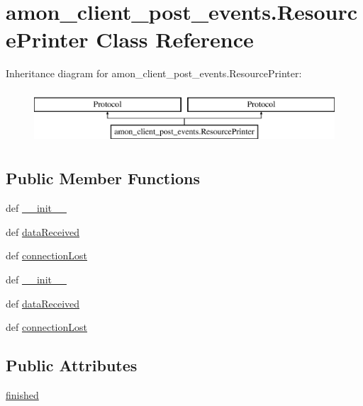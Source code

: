 \hypertarget{classamon__client__post__events_1_1_resource_printer}{\section{amon\-\_\-client\-\_\-post\-\_\-events.\-Resource\-Printer Class Reference}
\label{classamon__client__post__events_1_1_resource_printer}
}
Inheritance diagram for amon\-\_\-client\-\_\-post\-\_\-events.\-Resource\-Printer\-:\begin{figure}[H]
\begin{center}
\leavevmode
\includegraphics[height=2.000000cm]{d6/d38/classamon__client__post__events_1_1_resource_printer}
\end{center}
\end{figure}
\subsection*{Public Member Functions}
\begin{DoxyCompactItemize}
\item 
def \hyperlink{classamon__client__post__events_1_1_resource_printer_a545cf358c1e8ca262d0f1af51a056acd}{\-\_\-\-\_\-init\-\_\-\-\_\-}
\item 
def \hyperlink{classamon__client__post__events_1_1_resource_printer_ad6d5f4bc2e95b9e5e64060b75f67991e}{data\-Received}
\item 
def \hyperlink{classamon__client__post__events_1_1_resource_printer_a0f452c81698e230d9757c0529a1dd1c7}{connection\-Lost}
\item 
def \hyperlink{classamon__client__post__events_1_1_resource_printer_a545cf358c1e8ca262d0f1af51a056acd}{\-\_\-\-\_\-init\-\_\-\-\_\-}
\item 
def \hyperlink{classamon__client__post__events_1_1_resource_printer_ad6d5f4bc2e95b9e5e64060b75f67991e}{data\-Received}
\item 
def \hyperlink{classamon__client__post__events_1_1_resource_printer_a0f452c81698e230d9757c0529a1dd1c7}{connection\-Lost}
\end{DoxyCompactItemize}
\subsection*{Public Attributes}
\begin{DoxyCompactItemize}
\item 
\hyperlink{classamon__client__post__events_1_1_resource_printer_a3ce60f948a4daf648804159b510a78f8}{finished}
\end{DoxyCompactItemize}


